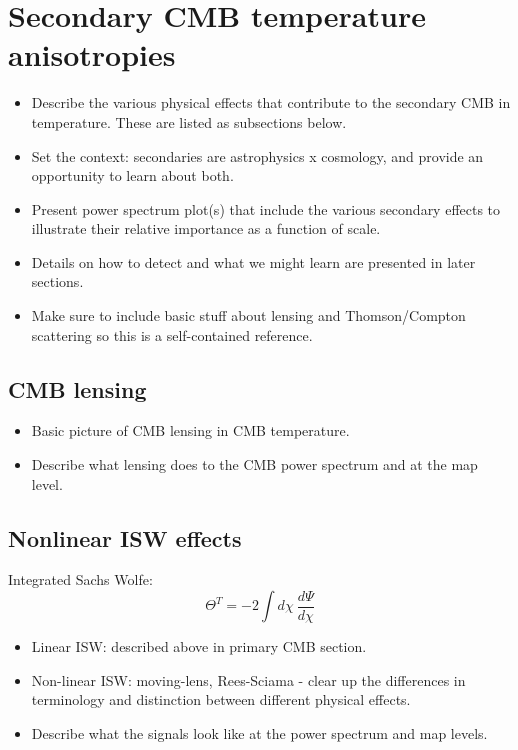 \documentclass[aps,nofootinbib,groupedaddress]{revtex4}
\begin{document}
\section{Secondary CMB temperature anisotropies}

\begin{itemize}
\item Describe the various physical effects that contribute to the secondary CMB in temperature. These are listed as subsections below.
\item Set the context: secondaries are astrophysics x cosmology, and provide an opportunity to learn about both. 
\item Present power spectrum plot(s) that include the various secondary effects to illustrate their relative importance as a function of scale.
\item Details on how to detect and what we might learn are presented in later sections.
\item Make sure to include basic stuff about lensing and Thomson/Compton scattering so this is a self-contained reference.
\end{itemize}

\subsection{CMB lensing}

\begin{itemize}
\item Basic picture of CMB lensing in CMB temperature. 
\item Describe what lensing does to the CMB power spectrum and at the map level.
\end{itemize}


\subsection{Nonlinear ISW effects}

Integrated Sachs Wolfe:
\begin{equation}
\Theta^T = -2\int d\chi \ \frac{d \Psi}{d\chi}
\end{equation}
\begin{itemize}
\item Linear ISW: described above in primary CMB section.
\item Non-linear ISW: moving-lens, Rees-Sciama - clear up the differences in terminology and distinction between different physical effects.
\item Describe what the signals look like at the power spectrum and map levels.
\end{itemize}
\end{document}
